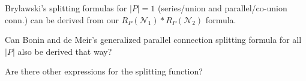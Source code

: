 \documentclass[%
  slidesonly,%
  semlayer,%
  amsmath
  ]{seminar}                                  %
\begin{document}
\begin{slide}
Brylawski's splitting formulas for $|P|=1$ (series/union and parallel/co-union conn.)
can be derived from our 
$R_P(\mathcal{N}_1)*R_P(\mathcal{N}_2)$ formula.

Can Bonin and de Meir's generalized parallel connection
splitting formula for all $|P|$ also be 
derived that way?  

Are there other expressions for the splitting function?
\end{slide}
\end{document}
